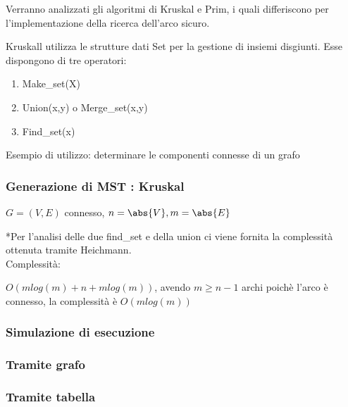 \documentclass[tikz]{article}
\providecommand{\tightlist}{%
  \setlength{\itemsep}{0pt}\setlength{\parskip}{0pt}}
\begin{document}
{{

{Verranno analizzati gli algoritmi di Kruskal e Prim, i quali differiscono per l'implementazione della ricerca dell'arco sicuro.}

{Kruskall utilizza le strutture dati Set per la gestione di insiemi disgiunti. Esse dispongono di tre operatori:}

\begin{enumerate}
\tightlist
\item
  {Make\_set(X)}
\item
  {Union(x,y) o Merge\_set(x,y)}
\item
  {Find\_set(x)}
\end{enumerate}

{Esempio di utilizzo: determinare le componenti connesse di un grafo}



\subsubsection{Generazione di MST : Kruskal}

$G=(V,E)$ connesso, $n=\abs{V},m=\abs{E}$



{*Per l'analisi delle due find\_set e della union ci viene fornita la complessità ottenuta tramite Heichmann.\\
}{Complessità}{:}

{$O(mlog(m)+n+mlog(m))$, avendo $m \geq n-1$ archi poichè l'arco è connesso, la complessità è $O(mlog(m))$}

\subsubsection{Simulazione di esecuzione}

\subsubsection{Tramite grafo}



\subsubsection{Tramite tabella}

}}
\end{document}
